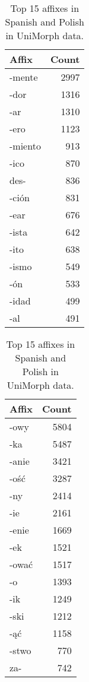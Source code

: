 \documentclass[12pt]{article}
\begin{document}
\begin{table}[htbp]
\centering
\small
\label{tbl:affixes}
\begin{minipage}[t]{0.48\textwidth}
\centering
{}
\begin{tabular}{lr}
\toprule
\textbf{Affix} & \textbf{Count} \\
\midrule
-mente  & 2997 \\
-dor    & 1316 \\
-ar     & 1310 \\
-ero    & 1123 \\
-miento & 913  \\
-ico    & 870  \\
des-    & 836  \\
-ción   & 831  \\
-ear    & 676  \\
-ista   & 642  \\
-ito    & 638  \\
-ismo   & 549  \\
-ón     & 533  \\
-idad   & 499  \\
-al     & 491  \\
\bottomrule
\end{tabular}
\end{minipage}
\hfill
\begin{minipage}[t]{0.48\textwidth}
\centering
{}
\begin{tabular}{lr}
\toprule
\textbf{Affix} & \textbf{Count} \\
\midrule
-owy   & 5804 \\
-ka    & 5487 \\
-anie  & 3421 \\
-ość  & 3287 \\
-ny    & 2414 \\
-ie    & 2161 \\
-enie  & 1669 \\
-ek    & 1521 \\
-ować  & 1517 \\
-o     & 1393 \\
-ik    & 1249 \\
-ski   & 1212 \\
-ąć   & 1158 \\
-stwo  & 770  \\
za-    & 742  \\
\bottomrule
\end{tabular}
\end{minipage}
\caption{Top 15 affixes in Spanish and Polish in UniMorph data.}
\end{table}
\end{document}
